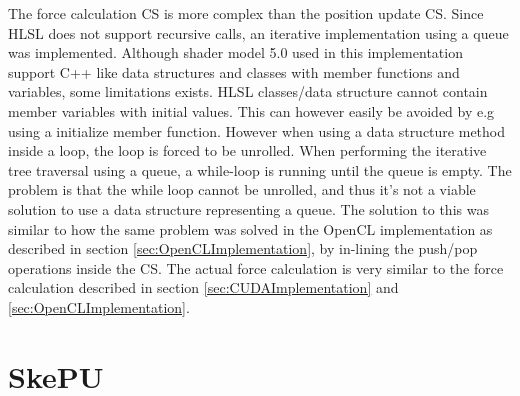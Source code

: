 The force calculation CS is more complex than the position update CS. Since HLSL does not support recursive calls, an iterative implementation using a queue was implemented. Although shader model 5.0 used in this implementation support C++ like data structures and classes with member functions and variables, some limitations exists. HLSL classes/data structure cannot contain member variables with initial values. This can however easily be avoided by e.g using a initialize member function. However when using a data structure method inside a loop, the loop is forced to be unrolled. When performing the iterative tree traversal using a queue, a while-loop is running until the queue is empty. The problem is that the while loop cannot be unrolled, and thus it's not a viable solution to use a data structure representing a queue. The solution to this was similar to how the same problem was solved in the OpenCL implementation as described in section \ref{sec:OpenCLImplementation}, by in-lining the push/pop operations inside the CS. The actual force calculation is very similar to the force calculation described in section \ref{sec:CUDAImplementation} and \ref{sec:OpenCLImplementation}.


\section{SkePU}






